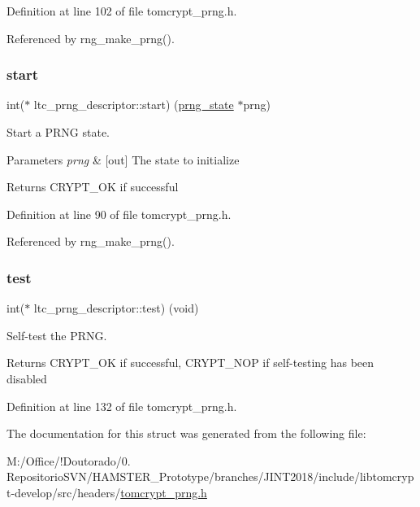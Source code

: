 Definition at line 102 of file tomcrypt\+\_\+prng.\+h.



Referenced by rng\+\_\+make\+\_\+prng().

\mbox{\label{structltc__prng__descriptor_a8a5ccd4e0c8f22ff0bd1778c26de8ab3}} 
\subsubsection{\texorpdfstring{start}{start}}
{\footnotesize\ttfamily int($\ast$ ltc\+\_\+prng\+\_\+descriptor\+::start) (\mbox{\hyperlink{structprng__state}{prng\+\_\+state}} $\ast$prng)}



Start a P\+R\+NG state. 


\begin{DoxyParams}{Parameters}
{\em prng} & \mbox{[}out\mbox{]} The state to initialize \\
\hline
\end{DoxyParams}
\begin{DoxyReturn}{Returns}
C\+R\+Y\+P\+T\+\_\+\+OK if successful 
\end{DoxyReturn}


Definition at line 90 of file tomcrypt\+\_\+prng.\+h.



Referenced by rng\+\_\+make\+\_\+prng().

\mbox{\label{structltc__prng__descriptor_aa8a3657bce888625318110283a80c363}} 
\subsubsection{\texorpdfstring{test}{test}}
{\footnotesize\ttfamily int($\ast$ ltc\+\_\+prng\+\_\+descriptor\+::test) (void)}



Self-\/test the P\+R\+NG. 

\begin{DoxyReturn}{Returns}
C\+R\+Y\+P\+T\+\_\+\+OK if successful, C\+R\+Y\+P\+T\+\_\+\+N\+OP if self-\/testing has been disabled 
\end{DoxyReturn}


Definition at line 132 of file tomcrypt\+\_\+prng.\+h.



The documentation for this struct was generated from the following file\+:\begin{DoxyCompactItemize}
\item 
M\+:/\+Office/!\+Doutorado/0. Repositorio\+S\+V\+N/\+H\+A\+M\+S\+T\+E\+R\+\_\+\+Prototype/branches/\+J\+I\+N\+T2018/include/libtomcrypt-\/develop/src/headers/\mbox{\hyperlink{tomcrypt__prng_8h}{tomcrypt\+\_\+prng.\+h}}\end{DoxyCompactItemize}
